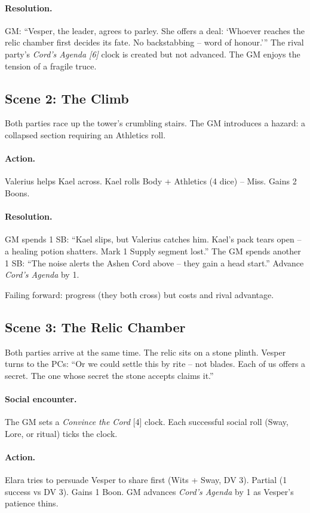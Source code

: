 \paragraph{Resolution.} GM: “Vesper, the leader, agrees to parley. She offers a deal: ‘Whoever reaches the relic chamber first decides its fate. No backstabbing – word of honour.’” The rival party’s \emph{Cord’s Agenda [6]} clock is created but not advanced. The GM enjoys the tension of a fragile truce.

\subsection*{Scene 2: The Climb}
Both parties race up the tower’s crumbling stairs. The GM introduces a hazard: a collapsed section requiring an Athletics roll.

\paragraph{Action.} Valerius helps Kael across. Kael rolls Body + Athletics (4 dice) – Miss. Gains 2 Boons.

\paragraph{Resolution.} GM spends 1 SB: “Kael slips, but Valerius catches him. Kael’s pack tears open – a healing potion shatters. Mark 1 Supply segment lost.” The GM spends another 1 SB: “The noise alerts the Ashen Cord above – they gain a head start.” Advance \emph{Cord’s Agenda} by 1.

Failing forward: progress (they both cross) but costs and rival advantage.

\subsection*{Scene 3: The Relic Chamber}
Both parties arrive at the same time. The relic sits on a stone plinth. Vesper turns to the PCs: “Or we could settle this by rite – not blades. Each of us offers a secret. The one whose secret the stone accepts claims it.”

\paragraph{Social encounter.} The GM sets a \emph{Convince the Cord} [4] clock. Each successful social roll (Sway, Lore, or ritual) ticks the clock.

\paragraph{Action.} Elara tries to persuade Vesper to share first (Wits + Sway, DV 3). Partial (1 success vs DV 3). Gains 1 Boon. GM advances \emph{Cord’s Agenda} by 1 as Vesper’s patience thins.

